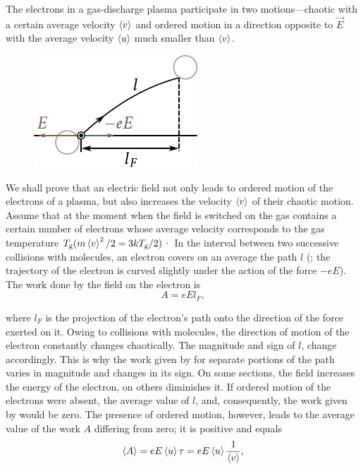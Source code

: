 The electrons in a gas-discharge plasma participate in two motions---chaotic with a certain average velocity $\left\langle v \right\rangle$ and ordered motion in a direction opposite to $\vec{E}$ with the average velocity $\left\langle u \right\rangle$ much smaller than $\left\langle v \right\rangle$.

\begin{figure}[t]
	\begin{center}
		\includegraphics[scale=1]{figures/ch_12/fig_12_7.pdf}
		\caption[]{}
		\label{fig:12_7}
	\end{center}
	\vspace{-0.8cm}
\end{figure}

We shall prove that an electric field not only leads to ordered motion of the electrons of a plasma, but also increases the velocity $\left\langle v \right\rangle$ of their chaotic motion.
Assume that at the moment when the field is switched on the gas contains a certain number of electrons whose average velocity corresponds to the gas temperature $T_{\text{g}}(m\left\langle v \right\rangle^2/2 = 3kT_{\text{g}}/2)$·
In the interval between two successive collisions with molecules, an electron covers on an average the path $l$ (; the trajectory of the electron is curved slightly under the action of the force $-eE$).
The work done by the field on the electron is
\begin{equation}\label{eq:12_16}
    A = e E l_F,
\end{equation}

\noindent
where $l_F$ is the projection of the electron's path onto the direction of the force exerted on it.
Owing to collisions with molecules, the direction of motion of the electron constantly changes chaotically.
The magnitude and sign of $l$, change accordingly.
This is why the work given by  for separate portions of the path varies in magnitude and changes in its sign.
On some sections, the field increases the energy of the electron, on others diminishes it.
If ordered motion of the electrons were absent, the average value of $l$, and, consequently, the work given by  would be zero.
The presence of ordered motion, however, leads to the average value of the work $A$ differing from zero; it is positive and equals
\begin{equation}\label{eq:12_17}
    \left\langle A \right\rangle = e E \left\langle u \right\rangle \tau = e E \left\langle u \right\rangle \frac{1}{\left\langle v \right\rangle},
\end{equation}

